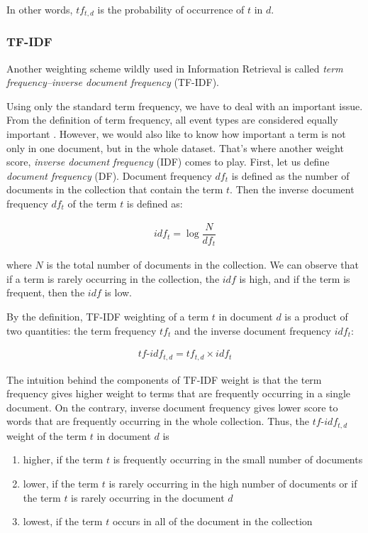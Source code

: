 In other words, $tf_{t, d}$ is the probability of occurrence of $t$ in $d$.


\subsubsection*{TF-IDF}
Another weighting scheme wildly used in Information Retrieval is called \textit{term frequency–inverse document frequency} (TF-IDF). 

Using only the standard term frequency, we have to deal with an important issue. From the definition of term frequency, all event types are considered equally important \cite{informationRetrieval2008}. However, we would also like to know how important a term is not only in one document, but in the whole dataset. That's where another weight score, \textit{inverse document frequency} (IDF) comes to play. First, let us define \textit{document frequency} (DF). Document frequency $df_t$ is defined as the number of documents in the collection that contain the term $t$. Then the inverse document frequency $df_t$ of the term $t$ is defined as: 

\begin{gather}
    idf_t = \log{\dfrac{N}{df_t}}
    \label{formula:idf}
\end{gather}

where $N$ is the total number of documents in the collection. We can observe that if a term is rarely occurring in the collection, the $idf$ is high, and if the term is frequent, then the $idf$ is low.

By the definition, TF-IDF weighting of a term $t$ in document $d$ is a product of two quantities: the term frequency $tf_t$ and the inverse document frequency $idf_t$:

\begin{gather}
    tf\text{-}idf_{t, d} = tf_{t,d} \times idf_t
    \label{formula:tfidf}
\end{gather}

The intuition behind the components of TF-IDF weight is that the term frequency gives higher weight to terms that are frequently occurring in a single document. On the contrary, inverse document frequency gives lower score to words that are frequently occurring in the whole collection. Thus, the $tf\text{-}idf_{t, d}$ weight of the term $t$ in document $d$ is 

\begin{enumerate}
    \item higher, if the term $t$ is frequently occurring in the small number of documents
    \item lower, if the term $t$ is rarely occurring in the high number of documents or if the term $t$ is rarely occurring in the document $d$
    \item lowest, if the term $t$ occurs in all of the document in the collection
\end{enumerate}


